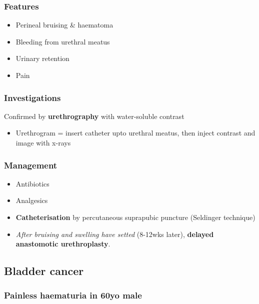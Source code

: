 \documentclass[
  14pt,
]{extarticle}
\providecommand{\tightlist}{%
  \setlength{\itemsep}{0pt}\setlength{\parskip}{0pt}}
\begin{document}
\hypertarget{features-5}{%
\subsubsection{Features}\label{features-5}}

\begin{itemize}
\tightlist
\item
  Perineal bruising \& haematoma
\item
  Bleeding from urethral meatus
\item
  Urinary retention
\item
  Pain
\end{itemize}

\hypertarget{investigations-4}{%
\subsubsection{Investigations}\label{investigations-4}}

Confirmed by \textbf{urethrography} with water-soluble contrast

\begin{itemize}
\tightlist
\item
  Urethrogram = insert catheter upto urethral meatus, then inject
  contrast and image with x-rays
\end{itemize}

\hypertarget{management}{%
\subsubsection{Management}\label{management}}

\begin{itemize}
\tightlist
\item
  Antibiotics
\item
  Analgesics
\item
  \textbf{Catheterisation} by percutaneous suprapubic puncture
  (Seldinger technique)
\item
  \emph{After bruising and swelling have setted} (8-12wks later),
  \textbf{delayed anastomotic urethroplasty}.
\end{itemize}

\pagebreak

\hypertarget{bladder-cancer}{%
\subsection{Bladder cancer}\label{bladder-cancer}}

\hypertarget{painless-haematuria-in-60yo-male}{%
\subsubsection{Painless haematuria in 60yo
male}\label{painless-haematuria-in-60yo-male}}
\end{document}
